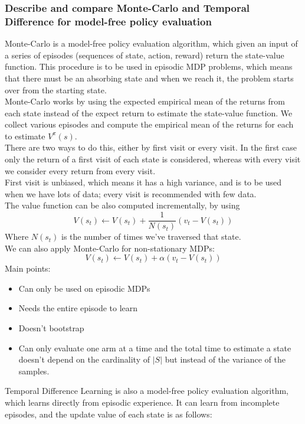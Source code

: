 \subsubsection{Describe and compare Monte-Carlo and Temporal Difference for model-free policy evaluation}
    Monte-Carlo is a model-free policy evaluation algorithm, which given an input of a series of episodes (sequences of state, action, reward) return the state-value function. This procedure is to be used in episodic MDP problems, which means that there must be an absorbing state and when we reach it, the problem starts over from the starting state.\\
    Monte-Carlo works by using the expected empirical mean of the returns from each state instead of the expect return to estimate the state-value function. We collect various episodes and compute the empirical mean of the returns for each to estimate $V^\pi(s)$.\\
    There are two ways to do this, either by first visit or every visit. In the first case only the return of a first visit of each state is considered, whereas with every visit we consider every return from every visit.\\
    First visit is unbiased, which means it has a high variance, and is to be used when we have lots of data; every visit is recommended with few data.\\
    The value function can be also computed incrementally, by using
    $$
    V(s_t) \leftarrow  V(s_t) + \frac{1}{N(s_t)}(v_t - V(s_t))
    $$
    Where $N(s_t)$ is the number of times we've traversed that state.\\
    We can also apply Monte-Carlo for non-stationary MDPs:
    $$
    V(s_t) \leftarrow V(s_t) + \alpha (v_t - V(s_t))
    $$
    Main points:
    \begin{itemize}
        \item Can only be used on episodic MDPs
        \item Needs the entire episode to learn
        \item Doesn't bootstrap
        \item Can only evaluate one arm at a time and the total time to estimate a state doesn't depend on the cardinality of $|S|$ but instead of the variance of the samples.
    \end{itemize}
    Temporal Difference Learning is also a model-free policy evaluation algorithm, which learns directly from episodic experience. It can learn from incomplete episodes, and the update value of each state is as follows:

